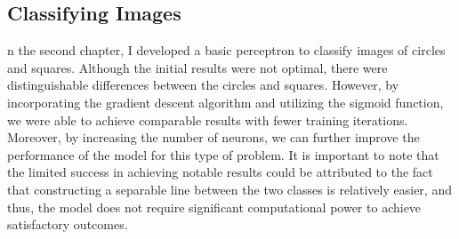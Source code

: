 \subsection{Classifying Images}
n the second chapter, I developed a basic perceptron to classify images of circles and squares. Although
the initial results were not optimal, there were distinguishable differences between the circles and squares.
However, by incorporating the gradient descent algorithm and utilizing the sigmoid function, we were able to
achieve comparable results with fewer training iterations. Moreover, by increasing the number of neurons, we
can further improve the performance of the model for this type of problem. It is important to note that the
limited success in achieving notable results could be attributed to the fact that constructing a separable
line between the two classes is relatively easier, and thus, the model does not require significant
computational power to achieve satisfactory outcomes.
